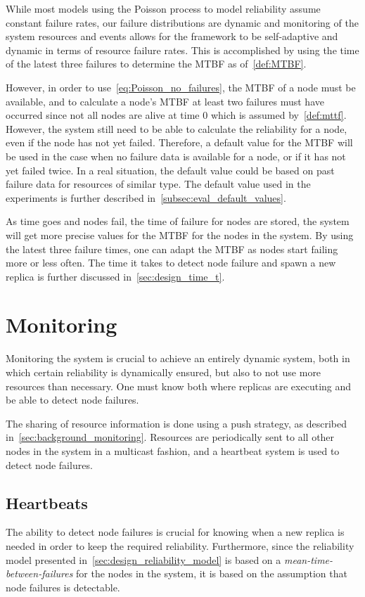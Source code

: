 \documentclass{cslthse-msc}
\begin{document}
While most models using the Poisson process to model reliability assume constant failure rates, our failure distributions are dynamic and monitoring of the system resources and events allows for the framework to be self-adaptive and dynamic in terms of resource failure rates. This is accomplished by using the time of the latest three failures to determine the MTBF as of~\cref{def:MTBF}. 

However, in order to use~\cref{eq:Poisson_no_failures}, the MTBF of a node must be available, and to calculate a node's MTBF at least two failures must have occurred since not all nodes are alive at time 0 which is assumed by~\cref{def:mttf}. However, the system still need to be able to calculate the reliability for a node, even if the node has not yet failed. Therefore, a default value for the MTBF will be used in the case when no failure data is available for a node, or if it has not yet failed twice. In a real situation, the default value could be based on past failure data for resources of similar type. The default value used in the experiments is further described in~\cref{subsec:eval_default_values}.

As time goes and nodes fail, the time of failure for nodes are stored, the system will get more precise values for the MTBF for the nodes in the system. By using the latest three failure times, one can adapt the MTBF as nodes start failing more or less often. The time it takes to detect node failure and spawn a new replica is further discussed in~\cref{sec:design_time_t}.


\section{Monitoring} \label{sec:design_monitoring}
Monitoring the system is crucial to achieve an entirely dynamic system, both in which certain reliability is dynamically ensured, but also to not use more resources than necessary. One must know both where replicas are executing and be able to detect node failures.

The sharing of resource information is done using a push strategy, as described in~\cref{sec:background_monitoring}. Resources are periodically sent to all other nodes in the system in a multicast fashion, and a heartbeat system is used to detect node failures.

\subsection{Heartbeats} \label{subsec:heartbeats}
The ability to detect node failures is crucial for knowing when a new replica is needed in order to keep the required reliability. Furthermore, since the reliability model presented in~\cref{sec:design_reliability_model} is based on a \emph{mean-time-between-failures} for the nodes in the system, it is based on the assumption that node failures is detectable. 
\end{document}
